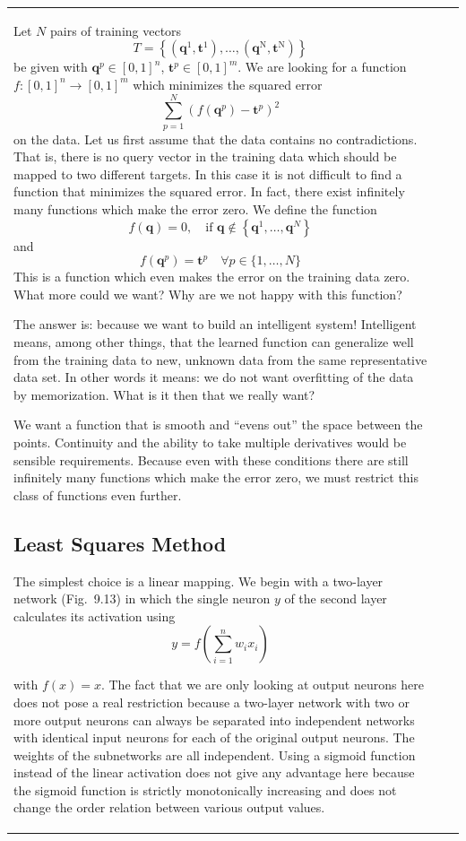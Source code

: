 \documentclass[10pt]{book}
\begin{document}
\begin{center}
\begin{tabular}{|l|l|l|}
Let $N$ pairs of training vectors
\[
T=\left\{\left(\boldsymbol{q}^{1}, \boldsymbol{t}^{1}\right), \ldots,\left(\boldsymbol{q}^{\mathrm{N}}, \boldsymbol{t}^{\mathrm{N}}\right)\right\}
\]
be given with $\boldsymbol{q}^{p} \in [0,1]^{n}$, $\boldsymbol{t}^{p} \in [0,1]^{m}$. We are looking for a function $f:[0,1]^{n} \rightarrow [0,1]^{m}$ which minimizes the squared error
\[
\sum_{p=1}^{N}\left(f\left(\boldsymbol{q}^{p}\right)-\boldsymbol{t}^{p}\right)^{2}
\]
on the data. Let us first assume that the data contains no contradictions. That is, there is no query vector in the training data which should be mapped to two different targets. In this case it is not difficult to find a function that minimizes the squared error. In fact, there exist infinitely many functions which make the error zero. We define the function
\[
f(\boldsymbol{q})=0, \quad \text{if } \boldsymbol{q} \notin\left\{\boldsymbol{q}^{1}, \ldots, \boldsymbol{q}^{N}\right\}
\]
and
\[
f\left(\boldsymbol{q}^{p}\right)=\boldsymbol{t}^{p} \quad \forall p \in\{1, \ldots, N\}
\]
This is a function which even makes the error on the training data zero. What more could we want? Why are we not happy with this function?

The answer is: because we want to build an intelligent system! Intelligent means, among other things, that the learned function can generalize well from the training data to new, unknown data from the same representative data set. In other words it means: we do not want overfitting of the data by memorization. What is it then that we really want?

We want a function that is smooth and ``evens out'' the space between the points. Continuity and the ability to take multiple derivatives would be sensible requirements. Because even with these conditions there are still infinitely many functions which make the error zero, we must restrict this class of functions even further.

\subsection{Least Squares Method}
The simplest choice is a linear mapping. We begin with a two-layer network (Fig.~9.13) in which the single neuron $y$ of the second layer calculates its activation using
$$
y=f\left(\sum_{i=1}^{n} w_{i} x_{i}\right)
$$

with $f(x)=x$. The fact that we are only looking at output neurons here does not pose a real restriction because a two-layer network with two or more output neurons can always be separated into independent networks with identical input neurons for each of the original output neurons. The weights of the subnetworks are all independent. Using a sigmoid function instead of the linear activation does not give any advantage here because the sigmoid function is strictly monotonically increasing and does not change the order relation between various output values.


\end{tabular}
\end{center}
\end{document}
